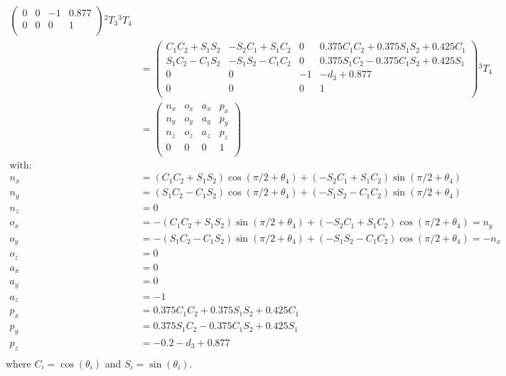 \documentclass[a4paper,11pt]{article}
\begin{document}
\begin {enumerate}
\begin{enumerate}
\begin{align*}
\begin{pmatrix}
                0 & 0 & -1 & 0.877\\
                0 & 0 & 0 & 1\\
            \end{pmatrix} {^2T_3}{^3T_4}\\
            &= \begin{pmatrix}
                C_1C_2 + S_1S_2 & -S_2C_1 + S_1C_2 & 0 & 0.375C_1C_2 + 0.375S_1S_2 + 0.425C_1\\
                S_1C_2-C_1S_2 & -S_1S_2-C_1C_2 & 0 & 0.375S_1C_2-0.375C_1S_2+0.425S_1\\
                0 & 0 & -1 & -d_3 + 0.877\\
                0 & 0 & 0 & 1\\
            \end{pmatrix} {^3T_4}\\
            &= \begin{pmatrix}
                n_x & o_x & a_x & p_x\\
                n_y & o_y & a_y & p_y\\
                n_z & o_z & a_z & p_z\\
                0 & 0 & 0 & 1\\
            \end{pmatrix}\\
            \text{with:}&\\
            n_x &= (C_1C_2 + S_1S_2)\cos(\pi/2 + \theta_4) + (-S_2C_1 + S_1C_2)\sin(\pi/2 + \theta_4)\\
            n_y &= (S_1C_2-C_1S_2)\cos(\pi/2 + \theta_4) + (-S_1S_2 - C_1C_2)\sin(\pi/2 + \theta_4)\\
            n_z &= 0\\
            o_x &= -(C_1C_2 + S_1S_2)\sin(\pi/2 + \theta_4) + (-S_2C_1 + S_1C_2)\cos(\pi/2 + \theta_4) = n_y\\
            o_y &= -(S_1C_2-C_1S_2)\sin(\pi/2 + \theta_4) + (-S_1S_2 - C_1C_2)\cos(\pi/2 + \theta_4) = -n_x\\
            o_z &= 0\\
            a_x &= 0\\
            a_y &= 0\\
            a_z &= -1\\
            p_x &= 0.375C_1C_2 + 0.375S_1S_2 + 0.425C_1\\
            p_y &= 0.375S_1C_2-0.375C_1S_2+0.425S_1\\
            p_z &= -0.2 - d_3 + 0.877\\
        \end{align*}
        where $C_i = \cos(\theta_i)$ and $S_i = \sin(\theta_i)$.


\end{enumerate}
\end{enumerate}
\end{document}
